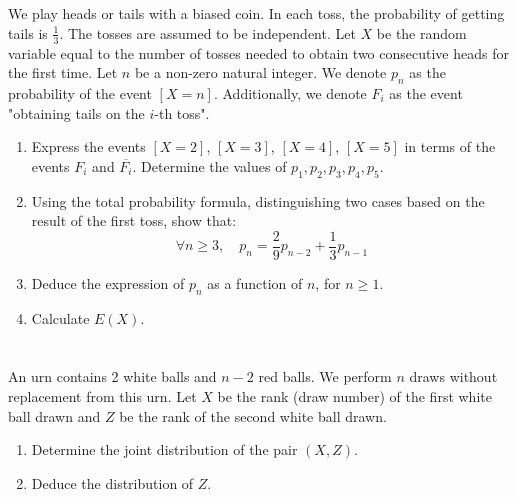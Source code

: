 \documentclass[12pt]{article}
\begin{document}
\begin{correctionbox}

\end{correctionbox}

\section{}
We play heads or tails with a biased coin. In each toss, the probability of getting tails is \( \frac{1}{3} \). The tosses are assumed to be independent. Let \( X \) be the random variable equal to the number of tosses needed to obtain two consecutive heads for the first time. Let \( n \) be a non-zero natural integer. We denote \( p_n \) as the probability of the event \( [X = n] \). Additionally, we denote \( F_i \) as the event "obtaining tails on the \( i \)-th toss".
\begin{enumerate}
    \item Express the events \( [X = 2] \), \( [X = 3] \), \( [X = 4] \), \( [X = 5] \) in terms of the events \( F_i \) and \( \overline{F_i} \). Determine the values of \( p_1, p_2, p_3, p_4, p_5 \).
    \item Using the total probability formula, distinguishing two cases based on the result of the first toss, show that:
    \[
    \forall n \geq 3, \quad p_n = \frac{2}{9} p_{n-2} + \frac{1}{3} p_{n-1}
    \]
    \item Deduce the expression of \( p_n \) as a function of \( n \), for \( n \geq 1 \).
    \item Calculate \( E(X) \).
\end{enumerate}

\begin{correctionbox}
    
\end{correctionbox}

\section{}
An urn contains 2 white balls and \( n - 2 \) red balls. We perform \( n \) draws without replacement from this urn. Let \( X \) be the rank (draw number) of the first white ball drawn and \( Z \) be the rank of the second white ball drawn.
\begin{enumerate}
    \item Determine the joint distribution of the pair \( (X, Z) \).
    \item Deduce the distribution of \( Z \).
\end{enumerate}
\end{document}
